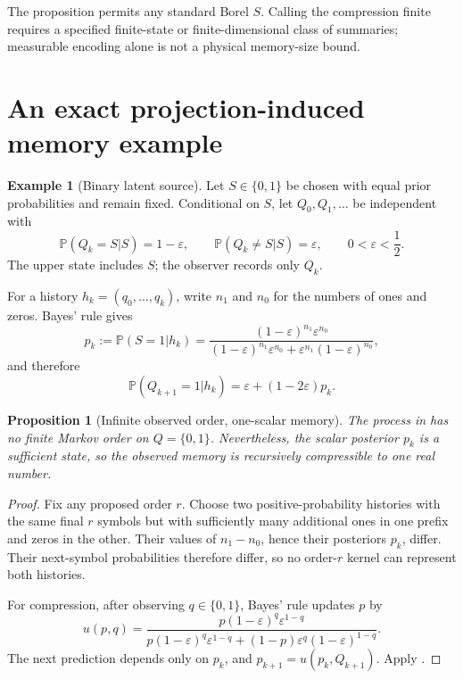 \documentclass[11pt]{article}
\newtheorem{proposition}[theorem]{Proposition}
\theoremstyle{definition}
\newtheorem{example}[theorem]{Example}
\theoremstyle{remark}
\newcommand{\PP}{\mathbb{P}}
\begin{document}
The proposition permits any standard Borel \(S\). Calling the compression
finite requires a specified finite-state or finite-dimensional class of
summaries; measurable encoding alone is not a physical memory-size bound.

\section{An exact projection-induced memory example}

\begin{example}[Binary latent source]\label{ex:binary}
Let \(S\in\{0,1\}\) be chosen with equal prior probabilities and remain fixed.
Conditional on \(S\), let \(Q_0,Q_1,\ldots\) be independent with
\[
\PP(Q_k=S|S)=1-\varepsilon,\qquad
\PP(Q_k\neq S|S)=\varepsilon,
\qquad 0<\varepsilon<\frac12.
\]
The upper state includes \(S\); the observer records only \(Q_k\).
\end{example}

For a history \(h_k=(q_0,\ldots,q_k)\), write \(n_1\) and \(n_0\) for the
numbers of ones and zeros.  Bayes' rule gives
\[
p_k:=\PP(S=1|h_k)
=\frac{(1-\varepsilon)^{n_1}\varepsilon^{n_0}}
{(1-\varepsilon)^{n_1}\varepsilon^{n_0}
 +\varepsilon^{n_1}(1-\varepsilon)^{n_0}},
\]
and therefore
\[
\PP(Q_{k+1}=1|h_k)
=\varepsilon+(1-2\varepsilon)p_k.
\]

\begin{proposition}[Infinite observed order, one-scalar memory]\label{prop:binary}
The process in  has no finite Markov order on \(Q=\{0,1\}\).
Nevertheless, the scalar posterior \(p_k\) is a sufficient state, so the
observed memory is recursively compressible to one real number.
\end{proposition}

\begin{proof}
Fix any proposed order \(r\).  Choose two positive-probability histories with
the same final \(r\) symbols but with sufficiently many additional ones in one
prefix and zeros in the other.  Their values of \(n_1-n_0\), hence their
posteriors \(p_k\), differ.  Their next-symbol probabilities therefore differ,
so no order-\(r\) kernel can represent both histories.

For compression, after observing \(q\in\{0,1\}\), Bayes' rule updates \(p\) by
\[
u(p,q)=
\frac{p(1-\varepsilon)^q\varepsilon^{1-q}}
{p(1-\varepsilon)^q\varepsilon^{1-q}
 +(1-p)\varepsilon^q(1-\varepsilon)^{1-q}}.
\]
The next prediction depends only on \(p_k\), and
\(p_{k+1}=u(p_k,Q_{k+1})\).  Apply .
\end{proof}
\end{document}
